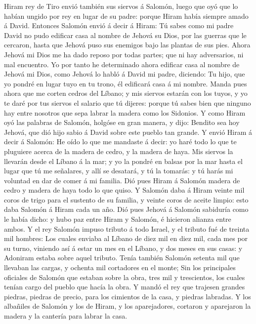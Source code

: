  Hiram rey de Tiro envió también sus siervos á Salomón,
luego que oyó que lo habían ungido por rey en lugar de su padre: porque
Hiram había siempre amado á David.  Entonces Salomón envió
á decir á Hiram:  Tú sabes como mi padre David no pudo
edificar casa al nombre de Jehová su Dios, por las guerras que le
cercaron, hasta que Jehová puso sus enemigos bajo las plantas de sus
pies.  Ahora Jehová mi Dios me ha dado reposo por todas
partes; que ni hay adversarios, ni mal encuentro.  Yo por
tanto he determinado ahora edificar casa al nombre de Jehová mi Dios,
como Jehová lo habló á David mi padre, diciendo: Tu hijo, que yo pondré
en lugar tuyo en tu trono, él edificará casa á mi nombre. 
Manda pues ahora que me corten cedros del Líbano; y mis siervos estarán
con los tuyos, y yo te daré por tus siervos el salario que tú dijeres:
porque tú sabes bien que ninguno hay entre nosotros que sepa labrar la
madera como los Sidonios.  Y como Hiram oyó las palabras
de Salomón, holgóse en gran manera, y dijo: Bendito sea hoy Jehová, que
dió hijo sabio á David sobre este pueblo tan grande.  Y
envió Hiram á decir á Salomón: He oído lo que me mandaste á decir: yo
haré todo lo que te pluguiere acerca de la madera de cedro, y la madera
de haya.  Mis siervos la llevarán desde el Líbano á la
mar; y yo la pondré en balsas por la mar hasta el lugar que tú me
señalares, y allí se desatará, y tú la tomarás: y tú harás mi voluntad
en dar de comer á mi familia.  Dió pues Hiram á Salomón
madera de cedro y madera de haya todo lo que quiso.  Y
Salomón daba á Hiram veinte mil coros de trigo para el sustento de su
familia, y veinte coros de aceite limpio: esto daba Salomón á Hiram cada
un año.  Dió pues Jehová á Salomón sabiduría como le
había dicho: y hubo paz entre Hiram y Salomón, é hicieron alianza entre
ambos.  Y el rey Salomón impuso tributo á todo Israel, y
el tributo fué de treinta mil hombres:  Los cuales
enviaba al Líbano de diez mil en diez mil, cada mes por su turno,
viniendo así á estar un mes en el Líbano, y dos meses en sus casas: y
Adoniram estaba sobre aquel tributo.  Tenía también
Salomón setenta mil que llevaban las cargas, y ochenta mil cortadores en
el monte;  Sin los principales oficiales de Salomón que
estaban sobre la obra, tres mil y trescientos, los cuales tenían cargo
del pueblo que hacía la obra.  Y mandó el rey que
trajesen grandes piedras, piedras de precio, para los cimientos de la
casa, y piedras labradas.  Y los albañiles de Salomón y
los de Hiram, y los aparejadores, cortaron y aparejaron la madera y la
cantería para labrar la casa.

